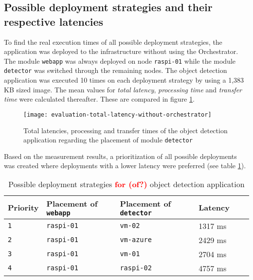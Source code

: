 \subsection*{Possible deployment strategies and their respective latencies}
To find the real execution times of all possible deployment strategies, the application was deployed to the infrastructure without using the Orchestrator.
The module \texttt{webapp} was always deployed on node \texttt{raspi-01} while the module \texttt{detector} was switched through the remaining nodes.
The object detection application was executed 10 times on each deployment strategy by using a 1,383 KB sized image.
The mean values for \textit{total latency}, \textit{processing time} and \textit{transfer time} were calculated thereafter. These are compared in figure \ref{fig:evaluation-total-latency-without-orchestrator}.

\begin{figure}[h!]
    \centering
    \texttt{[image: evaluation-total-latency-without-orchestrator]}
    \caption{Total latencies, processing and transfer times of the object detection application regarding the placement of module \texttt{detector}}
    \label{fig:evaluation-total-latency-without-orchestrator}
\end{figure}

Based on the measurement results, a prioritization of all possible deployments was created where deployments with a lower latency were preferred (see table \ref{tab:deployment-strategies-prios}).
\begin{table}[h!tb]
    \centering
    \begin{tabular}{|l|l|l|l|l|l|}
    \hline
        \textbf{Priority} & \textbf{Placement of \texttt{webapp}} & \textbf{Placement of \texttt{detector}} & \textbf{Latency} \\
         \hline
         \texttt{1} & \texttt{raspi-01} & \texttt{vm-02} & 1317 ms\\
         \hline
         \texttt{2} & \texttt{raspi-01} & \texttt{vm-azure} & 2429 ms\\
         \hline
         \texttt{3} & \texttt{raspi-01} & \texttt{vm-01} & 2704 ms\\
         \hline
         \texttt{4} & \texttt{raspi-01} & \texttt{raspi-02} & 4757 ms\\
         \hline
    \end{tabular}
    \caption{Possible deployment strategies \textcolor{red}{\textbf{for (of?)}} object detection application}
    \label{tab:deployment-strategies-prios}
\end{table}

